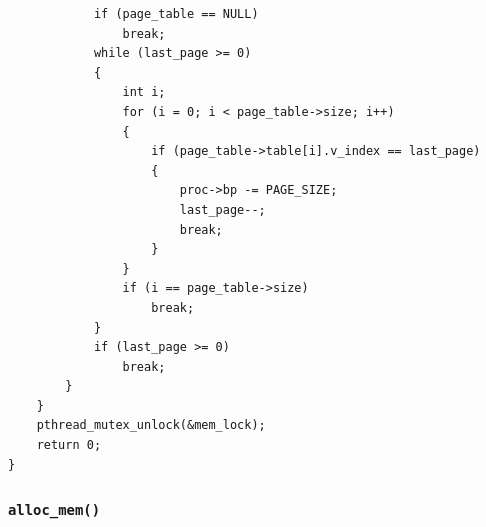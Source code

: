 \documentclass[a4paper]{article}
\numberwithin{equation}{section}
\begin{document}
\begin{mdframed}[leftline=false,rightline=false,backgroundcolor=blue!10,nobreak=false]
\begin{verbatim}
            if (page_table == NULL)
                break;
            while (last_page >= 0)
            {
                int i;
                for (i = 0; i < page_table->size; i++)
                {
                    if (page_table->table[i].v_index == last_page)
                    {
                        proc->bp -= PAGE_SIZE;
                        last_page--;
                        break;
                    }
                }
                if (i == page_table->size)
                    break;
            }
            if (last_page >= 0)
                break;
        }
    }
    pthread_mutex_unlock(&mem_lock);
    return 0;
}
  \end{verbatim}
\end{mdframed}

\subsubsection{\texttt{alloc_mem()}}
\end{document}
